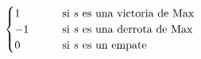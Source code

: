 \documentclass[preview]{standalone}
\begin{document}
\begin{align*}
\begin{cases}
                                 1 \qquad &\text{si $s$ es una victoria de Max} \cr
                                 -1 \qquad &\text{si $s$ es una derrota de Max} \cr
                                 0 \qquad &\text{si $s$ es un empate} \cr 
                                 \end{cases}
\end{align*}
\end{document}
